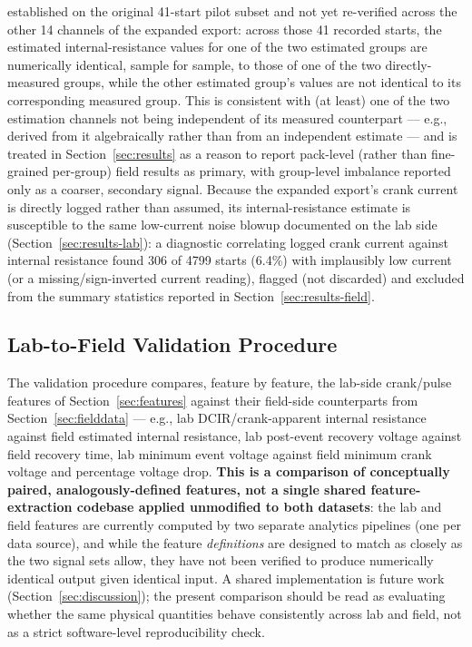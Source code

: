 \documentclass[conference]{IEEEtran}
\begin{document}
established on the original 41-start pilot subset and not yet re-verified across the other 14 channels of the expanded export: across those 41 recorded starts, the estimated internal-resistance values for one of the two estimated groups are numerically identical, sample for sample, to those of one of the two directly-measured groups, while the other estimated group's values are not identical to its corresponding measured group. This is consistent with (at least) one of the two estimation channels not being independent of its measured counterpart --- e.g., derived from it algebraically rather than from an independent estimate --- and is treated in Section~\ref{sec:results} as a reason to report pack-level (rather than fine-grained per-group) field results as primary, with group-level imbalance reported only as a coarser, secondary signal. Because the expanded export's crank current is directly logged rather than assumed, its internal-resistance estimate is susceptible to the same low-current noise blowup documented on the lab side (Section~\ref{sec:results-lab}): a diagnostic correlating logged crank current against internal resistance found 306 of 4799 starts (6.4\%) with implausibly low current (or a missing/sign-inverted current reading), flagged (not discarded) and excluded from the summary statistics reported in Section~\ref{sec:results-field}.

\subsection{Lab-to-Field Validation Procedure}
\label{sec:validation}

The validation procedure compares, feature by feature, the lab-side crank/pulse features of Section~\ref{sec:features} against their field-side counterparts from Section~\ref{sec:fielddata} --- e.g., lab DCIR/crank-apparent internal resistance against field estimated internal resistance, lab post-event recovery voltage against field recovery time, lab minimum event voltage against field minimum crank voltage and percentage voltage drop. \textbf{This is a comparison of conceptually paired, analogously-defined features, not a single shared feature-extraction codebase applied unmodified to both datasets}: the lab and field features are currently computed by two separate analytics pipelines (one per data source), and while the feature \emph{definitions} are designed to match as closely as the two signal sets allow, they have not been verified to produce numerically identical output given identical input. A shared implementation is future work (Section~\ref{sec:discussion}); the present comparison should be read as evaluating whether the same physical quantities behave consistently across lab and field, not as a strict software-level reproducibility check.
\end{document}
